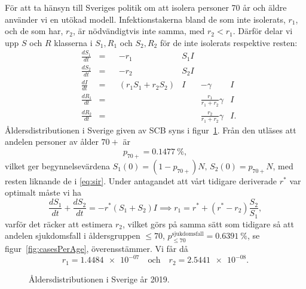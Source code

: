 \documentclass{article}
\begin{document}
För att ta hänsyn till Sveriges politik om att isolera personer 70 år och äldre
använder vi en utökad modell.
Infektionstakerna bland de som inte isolerats, $r_1$, och de som har, $r_2$,
är nödvändigtvis inte samma, med $r_2 < r_1$.
Därför delar vi upp $S$ och $R$ klasserna i $S_1, R_1$ och $S_2, R_2$
för de inte isolerats respektive resten:
\begin{equation}\label{eq:ssirr}
	\begin{alignedat}{4}
		& \frac{dS_1}{dt} &=& &-r_1&S_1I && \\
		& \frac{dS_2}{dt} &=& &-r_2&S_2I && \\
		& \frac{dI}{dt} &=& &(r_1S_1 + r_2S_2)&I &-\gamma& I \\
		& \frac{dR_1}{dt} &=& && &\frac{r_1}{r_1 + r_2} \gamma& I \\
		& \frac{dR_2}{dt} &=& && &\frac{r_2}{r_1 + r_2} \gamma& I.
	\end{alignedat}
\end{equation}
Åldersdistributionen i Sverige given av SCB syns i figur~\ref{fig:pop_dist}.
Från den utläses att andelen personer av ålder $70+$ är
$$ p_{70+} = \SI{0.1477}\percent, $$
vilket ger begynnelsevärdena $S_1(0) = (1 - p_{70+}) N, \, S_2(0) = p_{70+} N$,
med resten liknande de i \eqref{eq:sir}.
Under antagandet att vårt tidigare deriverade $r^*$ var optimalt
måste vi ha
$$ \frac{dS_1}{dt} + \frac{dS_2}{dt} = -r^* (S_1 + S_2) I \implies r_1 = r^* + (r^* - r_2) \frac{S_2}{S_1}, $$
varför det räcker att estimera $r_2$, vilket görs på samma sätt som tidigare
så att andelen sjukdomsfall i åldersgruppen $\le 70$,
$p_{\le 70}^\text{sjukdomsfall} = \SI{0.6391}\percent$,
se figur~\ref{fig:casesPerAge}, överensstämmer.
Vi får då
$$ r_1 = \num{1.4484e-07} \quad \text{och} \quad r_2 = \num{2.5441e-08}. $$

\begin{figure}
	\centering
	\caption{Åldersdistributionen i Sverige år 2019. \autocite{populationDist} \label{fig:pop_dist}}
\end{figure}
\end{document}
